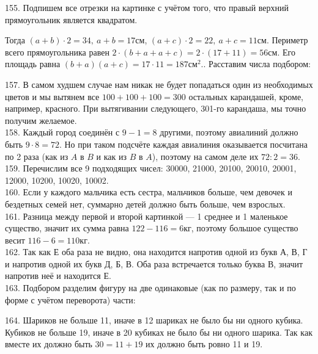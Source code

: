 155. Подпишем все отрезки на картинке с учётом того, что правый верхний прямоугольник является квадратом.
\begin{center}
\begin{figure}[ht!]
\end{figure}
\end{center}
Тогда $(a+b)\cdot2=34,\ a+b=17$см, $(a+c)\cdot2=22,\ a+c=11$см. Периметр всего прямоугольника равен $2\cdot(b+a+a+c)=2\cdot(17+11)=56$см. Его площадь равна $(b+a)(a+c)=17\cdot11=187\text{см}^2.$\newpage{}. Расставим числа подбором:
\begin{center}
\begin{figure}[ht!]
\end{figure}
\end{center}
157. В самом худшем случае нам никак не будет попадаться один из необходимых цветов и мы вытянем все $100+100+100=300$ остальных карандашей, кроме, например, красного. При вытягивании следующего, 301-го карандаша, мы точно получим желаемое.\\
158. Каждый город соединён с $9-1=8$ другими, поэтому авиалиний должно быть $9\cdot8=72.$ Но при таком подсчёте каждая авиалиния оказывается посчитана по 2 раза (как из $A$ в $B$ и как из $B$ в $A$), поэтому на самом деле их $72:2=36.$\\
159. Перечислим все 9 подходящих чисел: 30000, 21000, 20100, 20010, 20001, 12000, 10200, 10020, 10002.\\
160. Если у каждого мальчика есть сестра, мальчиков больше, чем девочек и бездетных семей нет, суммарно детей должно быть больше, чем взрослых.\\
161. Разница между первой и второй картинкой --- 1 среднее и 1 маленькое существо, значит их сумма равна $122-116=6$кг, поэтому большое существо весит $116-6=110$кг.\\
162. Так как Е оба раза не видно, она находится напротив одной из букв А, В, Г и напротив одной их букв Д, Б, В. Оба раза встречается только буква В, значит напротив неё и находится Е.\\
163. Подбором разделим фигуру на две одинаковые (как по размеру, так и по форме с учётом переворота) части:
\begin{center}
\begin{figure}[ht!]
\end{figure}
\end{center}
164. Шариков не больше 11, иначе в 12 шариках не было бы ни одного кубика. Кубиков не больше 19, иначе в 20 кубиках не было бы ни одного шарика. Так как вместе их должно быть $30=11+19$ их должно быть ровно 11 и 19.\\
